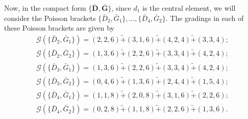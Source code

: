 \documentclass[10pt]{amsart}
\theoremstyle{definition}
\theoremstyle{corollary}
\theoremstyle{remark}
\theoremstyle{conclusion}
\begin{document}
Now, in the compact form $ \{\bar{\textbf{D}},\bar{\textbf{G}}\}$, since $d_1$ is the central element, we will consider the Poisson brackets $\{\bar{D}_2, \bar{G}_1\}, \ldots, \{\bar{D}_4, \bar{G}_2\}$. The gradings in each of these Poisson brackets are given by \begin{align}
        \mathcal{G} \left(\{\bar{D}_2, \bar{G}_1\}\right) = (2,2,6) \tilde{+} (3,1,6) \tilde{+} (4,2,4) \tilde{+}(3,3,4); \nonumber \\
       \mathcal{G} \left(\{\bar{D}_2, \bar{G}_2\}\right) = (1,3,6)  \tilde{+} (2,2,6)\tilde{+} (3,3,4) \tilde{+}(4,2,4); \nonumber\\
      \mathcal{G} \left(\{\bar{D}_3, \bar{G}_1\}\right) = (1,3,6) \tilde{+} (2,2,6) \tilde{+} (3,3,4) \tilde{+}(4,2,4); \nonumber \\
     \mathcal{G} \left(\{\bar{D}_3, \bar{G}_2\}\right) = (0,4,6) \tilde{+} (1,3,6) \tilde{+} (2 ,4,4) \tilde{+}(1,5,4); \nonumber \\
     \mathcal{G} \left(\{\bar{D}_4, \bar{G}_1\}\right) =  (1,1,8)\tilde{+}(2,0,8)  \tilde{+} (3,1,6) \tilde{+}(2,2,6); \nonumber \\
     \mathcal{G} \left(\{\bar{D}_4, \bar{G}_2\}\right) = (0,2,8) \tilde{+} (1,1,8) \tilde{+} (2,2,6) \tilde{+}(1,3,6).
\end{align}  
\end{document}
